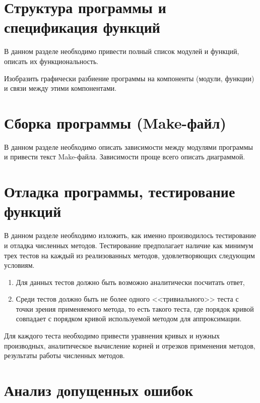 \documentclass[a4paper,12pt,titlepage,draft]{article}
\begin{document}
\newpage

\section{Структура программы и спецификация функций}

В данном разделе необходимо привести полный список модулей и функций,
описать их функциональность.

Изобразить графически разбиение программы на компоненты (модули, функции)
и связи между этими компонентами.

\newpage

\section{Сборка программы (Make-файл)}

В данном разделе необходимо описать зависимости между модулями программы
и привести текст Make-файла. Зависимости проще всего описать диаграммой.

\newpage

\section{Отладка программы, тестирование функций}

В данном разделе необходимо изложить, как именно производилось тестирование
и отладка численных методов. Тестирование предполагает наличие как минимум
трех тестов на каждый из реализованных методов, удовлетворяющих следующим
условиям.
\begin{enumerate}
\item Для данных тестов должно быть возможно аналитически посчитать ответ,
\item Среди тестов должно быть не более одного <<тривиального>> теста
    с точки зрения применяемого метода, то есть такого теста, где порядок
    кривой совпадает с порядком кривой используемой методом для аппроксимации.
\end{enumerate}

Для каждого теста необходимо привести уравнения кривых и нужных производных,
аналитическое вычисление корней и отрезков применения методов, результаты
работы численных методов.

\newpage

\section{Анализ допущенных ошибок}
\end{document}
